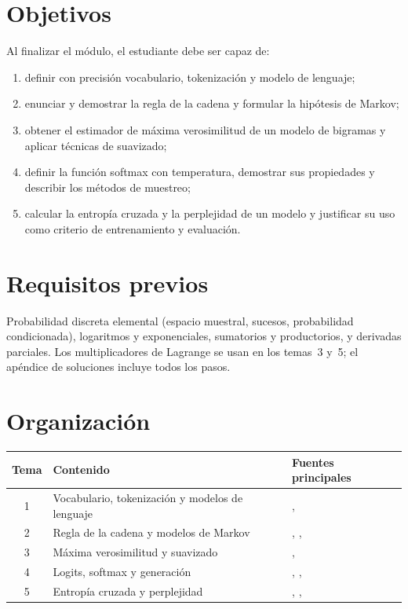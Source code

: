 \documentclass[11pt,a4paper,twoside,openany]{book}
\begin{document}
\section*{Objetivos}
Al finalizar el módulo, el estudiante debe ser capaz de:
\begin{enumerate}[label=\arabic*.]
  \item definir con precisión vocabulario, tokenización y modelo de lenguaje;
  \item enunciar y demostrar la regla de la cadena y formular la hipótesis de Markov;
  \item obtener el estimador de máxima verosimilitud de un modelo de bigramas y aplicar técnicas de suavizado;
  \item definir la función softmax con temperatura, demostrar sus propiedades y describir los métodos de muestreo;
  \item calcular la entropía cruzada y la perplejidad de un modelo y justificar su uso como criterio de entrenamiento y evaluación.
\end{enumerate}

\section*{Requisitos previos}
Probabilidad discreta elemental (espacio muestral, sucesos, probabilidad condicionada), logaritmos y exponenciales, sumatorios y productorios, y derivadas parciales. Los multiplicadores de Lagrange se usan en los temas~3 y~5; el apéndice de soluciones incluye todos los pasos.

\section*{Organización}
\begin{center}
\begin{tabular}{@{}cll@{}}
\toprule
Tema & Contenido & Fuentes principales \\
\midrule
1 & Vocabulario, tokenización y modelos de lenguaje & \cite{jm3}, \cite{cs224n} \\
2 & Regla de la cadena y modelos de Markov & \cite{bt}, \cite{mit6041}, \cite{jm3} \\
3 & Máxima verosimilitud y suavizado & \cite{jm3}, \cite{bishop} \\
4 & Logits, softmax y generación & \cite{d2l}, \cite{gbc}, \cite{holtzman} \\
5 & Entropía cruzada y perplejidad & \cite{jm3}, \cite{ct}, \cite{mackay} \\
\bottomrule
\end{tabular}
\end{center}
\end{document}
